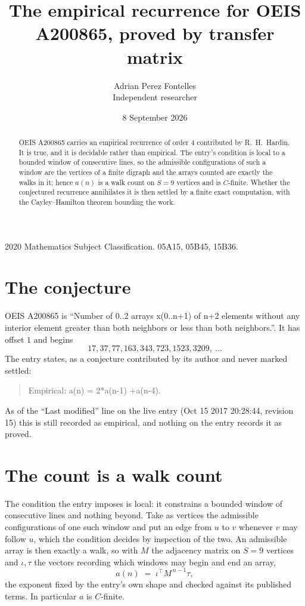 \documentclass[11pt,a4paper]{article}
\title{The empirical recurrence for OEIS A200865, proved by transfer matrix}
\author{Adrian Perez Fontelles\\ \small Independent researcher}
\date{8 September 2026}
\theoremstyle{plain}
\theoremstyle{definition}
\begin{document}
\maketitle

\begin{abstract}
OEIS A200865 carries an empirical recurrence of order $4$ contributed by R.~H.~Hardin. It is
true, and it is decidable rather than empirical. The entry's condition is local to a bounded window of consecutive lines, so
the admissible configurations of such a window are the vertices of a finite digraph and the
arrays counted are exactly the walks in it; hence $a(n)$ is a walk count on $S=9$ vertices
and is $C$-finite. Whether the conjectured recurrence annihilates it is then settled by a
finite exact computation, with the Cayley--Hamilton theorem bounding the work.
\end{abstract}

\noindent\small 2020 Mathematics Subject Classification. 05A15, 05B45, 15B36.\normalsize

\section{The conjecture}

OEIS A200865 is ``Number of 0..2 arrays x(0..n+1) of n+2 elements without any interior element greater than both neighbors or less than both neighbors.''. It has offset $1$ and begins
\[
17, 37, 77, 163, 343, 723, 1523, 3209,\ \dots
\]
The entry states, as a conjecture contributed by its author and never marked settled:
\begin{quote}
Empirical: a(n) = 2*a(n-1) +a(n-4).
\end{quote}
As of the ``Last modified'' line on the live entry (Oct 15 2017 20:28:44, revision 15) this is still
recorded as empirical, and nothing on the entry records it as proved.

\section{The count is a walk count}

The condition the entry imposes is local: it constrains a bounded window of consecutive lines and nothing beyond. Take as
vertices the admissible configurations of one such window and put an edge from $u$ to $v$
whenever $v$ may follow $u$, which the condition decides by inspection of the two. An
admissible array is then exactly a walk, so with $M$ the adjacency matrix on $S=9$ vertices
and $\iota,\tau$ the vectors recording which windows may begin and end an array,
\[
a(n)\;=\;\iota^{\!\top}M^{\,n-1}\tau ,
\]
the exponent fixed by the entry's own shape and checked against its published terms. In
particular $a$ is $C$-finite.
\end{document}
